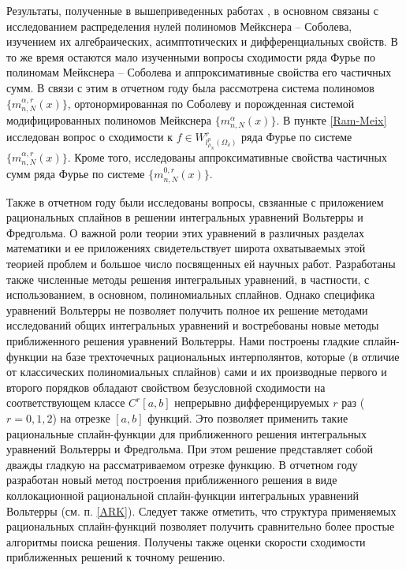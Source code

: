 Результаты, полученные в вышеприведенных работах \cite{Ram-Shar-VMJ,Ram-Ar-Go-Mar,Ram-Kh-Old,Ram-Bav1,Ram-Bav2,Ram-Shar-Sar,Ram-Mor-Bal,Ram-Co-So-Vil}, в основном связаны с исследованием распределения нулей полиномов Мейкснера --  Соболева, изучением их алгебраических, асимптотических и дифференциальных свойств. В то же время остаются мало изученными вопросы сходимости ряда Фурье по полиномам Мейкснера -- Соболева и аппроксимативные свойства его частичных сумм. В связи с этим в отчетном году была рассмотрена система полиномов $\{m_{n,N}^{\alpha,r}(x)\}$, ортонормированная по Соболеву и порожденная системой модифицированных полиномов Мейкснера $\{m_{n,N}^{\alpha}(x)\}$. В пункте \ref{Ram-Meix} исследован вопрос о сходимости к $f\in W^r_{l^p_{\rho_N}(\Omega_\delta)}$ ряда Фурье по системе $\{m_{n,N}^{\alpha,r}(x)\}$. Кроме того, исследованы аппроксимативные свойства частичных сумм ряда Фурье по системе $\{m_{n,N}^{0,r}(x)\}$.

Также в отчетном году были исследованы вопросы, свзяанные с приложением рациональных сплайнов в решении интегральных уравнений Вольтерры и Фредгольма. О важной роли теории этих уравнений в различных разделах математики и ее приложениях свидетельствует широта охватываемых этой теорией проблем и большое число посвященных ей научных работ. Разработаны также численные методы решения интегральных уравнений, в частности, с использованием, в основном, полиномиальных сплайнов. Однако специфика уравнений Вольтерры не позволяет получить полное их решение методами исследований общих интегральных уравнений и востребованы новые методы приближенного решения уравнений Вольтерры.
Нами построены гладкие сплайн-функции на базе трехточечных рациональных
интерполянтов, которые (в отличие от классических полиномиальных сплайнов)
сами и их производные первого и второго
порядков обладают свойством безусловной сходимости
на соответствующем классе $C^r[a,b]$ непрерывно дифференцируемых $r$ раз
($r=0,1,2$) на отрезке $[a,b]$ функций.
Это позволяет применить такие рациональные сплайн-функции для приближенного
решения интегральных уравнений Вольтерры и Фредгольма.
При этом решение представляет собой дважды гладкую на рассматриваемом отрезке
функцию.
В отчетном году разработан новый метод построения приближенного решения в виде коллокационной рациональной сплайн-функции
интегральных уравнений Вольтерры (см. п. \ref{ARK}). Следует также отметить, что структура применяемых рациональных сплайн-функций
позволяет получить сравнительно более простые алгоритмы поиска решения. Получены также оценки скорости сходимости приближенных решений к точному решению.

